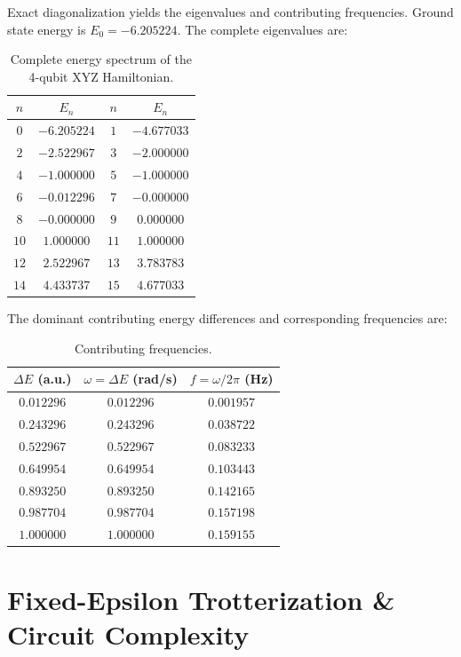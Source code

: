\documentclass[11pt,a4paper]{article}
\begin{document}
Exact diagonalization yields the eigenvalues and contributing frequencies. Ground state energy is $E_0 = -6.205224$. The complete eigenvalues are:

\begin{table}[H]
\centering
\caption{Complete energy spectrum of the 4-qubit XYZ Hamiltonian.}
\label{tab:eigenvalues}
\begin{tabular}{cc|cc}
\toprule
$n$ & $E_n$ & $n$ & $E_n$ \\
\midrule
$0$ & $-6.205224$ & $1$ & $-4.677033$ \\
$2$ & $-2.522967$ & $3$ & $-2.000000$ \\
$4$ & $-1.000000$ & $5$ & $-1.000000$ \\
$6$ & $-0.012296$ & $7$ & $-0.000000$ \\
$8$ & $-0.000000$ & $9$ & $0.000000$ \\
$10$ & $1.000000$ & $11$ & $1.000000$ \\
$12$ & $2.522967$ & $13$ & $3.783783$ \\
$14$ & $4.433737$ & $15$ & $4.677033$ \\
\bottomrule
\end{tabular}
\end{table}

The dominant contributing energy differences and corresponding frequencies are:
\begin{table}[H]
\centering
\caption{Contributing frequencies.}
\label{tab:energy_diffs}
\begin{tabular}{ccc}
\toprule
$\Delta E$ (a.u.) & $\omega = \Delta E$ (rad/s) & $f = \omega / 2\pi$ (Hz) \\
\midrule
$0.012296$ & $0.012296$ & $0.001957$ \\
$0.243296$ & $0.243296$ & $0.038722$ \\
$0.522967$ & $0.522967$ & $0.083233$ \\
$0.649954$ & $0.649954$ & $0.103443$ \\
$0.893250$ & $0.893250$ & $0.142165$ \\
$0.987704$ & $0.987704$ & $0.157198$ \\
$1.000000$ & $1.000000$ & $0.159155$ \\
\bottomrule
\end{tabular}
\end{table}

\section{Fixed-Epsilon Trotterization \& Circuit Complexity}
\end{document}
